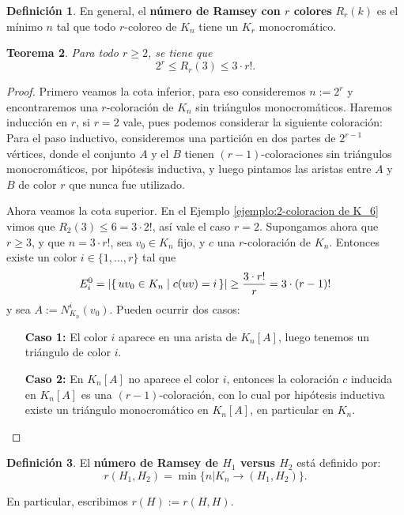 \documentclass[12pt]{report}
\theoremstyle{plain}
\newtheorem{theorem}{Teorema}[section]
\theoremstyle{definition}
\newtheorem{definition}[theorem]{Definición}
\newcommand{\abs}[1]{\left \vert #1 \right \vert}
\begin{document}
\begin{definition}
En general, el \textbf{número de Ramsey con $r$ colores} $R_r (k)$ es el mínimo $n$ tal que todo $r$-coloreo de $K_n$ tiene un $K_r$ monocromático.
\end{definition}

\begin{theorem}
Para todo $r \geq 2$, se tiene que
\[
    2^r \leq R_r (3) \leq 3 \cdot r!.
\]
\end{theorem}
\begin{proof}
Primero veamos la cota inferior, para eso consideremos $n:= 2^r$ y encontraremos una $r$-coloración de $K_n$ sin triángulos monocromáticos. Haremos inducción en $r$, si $r = 2$ vale, pues podemos considerar la siguiente coloración:
Para el paso inductivo, consideremos una partición en dos partes de $2^{r-1}$ vértices, donde el conjunto $A$ y el $B$ tienen $(r-1)$-coloraciones sin triángulos monocromáticos, por hipótesis inductiva, y luego pintamos las aristas entre $A$ y $B$ de color $r$ que nunca fue utilizado.

Ahora veamos la cota superior. En el Ejemplo \ref{ejemplo:2-coloracion de K_6} vimos que $R_2(3) \leq 6 = 3 \cdot 2 !$, así vale el caso $r = 2$. Supongamos ahora que $r \geq 3$, y que $n = 3 \cdot r!$, sea $v_0 \in K_n$ fijo, y $c$ una $r$-coloración de $K_n$. Entonces existe un color $i \in  \{1, \ldots, r\}$ tal que
\[
    E_i^0 = \abs{\set{uv_0 \in K_n | c (uv) = i}} \geq \frac{3 \cdot r !}{r} = 3 \cdot (r-1)!
\]
y sea $A := N_{K_n}^i (v_0)$. Pueden ocurrir dos casos:
\begin{enumerate}
\item[\textbf{Caso 1:}] El color $i$ aparece en una arista de $K_n [A]$, luego tenemos un triángulo de color $i$.
\item[\textbf{Caso 2:}] En $K_n [A]$ no aparece el color $i$, entonces la coloración $c$ inducida en $K_n [A]$ es una $(r-1)$-coloración, con lo cual por hipótesis inductiva existe un triángulo monocromático en $K_n [A]$, en particular en $K_n$.
\end{enumerate}

\end{proof}


\begin{definition}
El \textbf{número de Ramsey de $H_1$ versus $H_2$} está definido por:
\[
    r(H_1, H_2) = \min \{ n | K_n \to (H_1, H_2)\}.
\]

En particular, escribimos $r (H):= r (H,H)$.
\end{definition}
\end{document}
